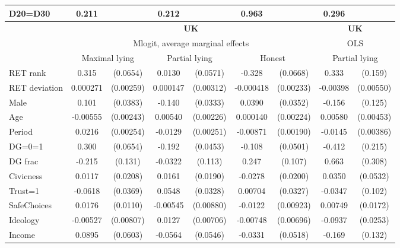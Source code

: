 \begin{tabular}{l|cccccc|cc}
D20=D30         &    0.211         &         &    0.212         &         &    0.963         &         &    0.296         &         \\
\hline\hline
&\multicolumn{6}{c|}{\bf UK}&\multicolumn{2}{c}{\bf UK}\\ &\multicolumn{6}{c|}{Mlogit, average marginal effects }&\multicolumn{2}{c}{OLS}\\
                &\multicolumn{2}{c}{Maximal lying}&\multicolumn{2}{c}{Partial lying}&\multicolumn{2}{c}{Honest}  &\multicolumn{2}{c}{Partial lying}\\
\hline
RET rank        &    0.315\sym{***}& (0.0654)&   0.0130         & (0.0571)&   -0.328\sym{***}& (0.0668)&    0.333\sym{**} &  (0.159)\\
RET deviation   & 0.000271         &(0.00259)& 0.000147         &(0.00312)&-0.000418         &(0.00233)& -0.00398         &(0.00550)\\
Male            &    0.101\sym{***}& (0.0383)&   -0.140\sym{***}& (0.0333)&   0.0390         & (0.0352)&   -0.156         &  (0.125)\\
Age             & -0.00555\sym{**} &(0.00243)&  0.00540\sym{**} &(0.00226)& 0.000140         &(0.00224)&  0.00580         &(0.00453)\\
Period          &   0.0216\sym{***}&(0.00254)&  -0.0129\sym{***}&(0.00251)& -0.00871\sym{***}&(0.00190)&  -0.0145\sym{***}&(0.00386)\\
DG=0=1          &    0.300\sym{***}& (0.0654)&   -0.192\sym{***}& (0.0453)&   -0.108\sym{**} & (0.0501)&   -0.412\sym{*}  &  (0.215)\\
DG frac         &   -0.215         &  (0.131)&  -0.0322         &  (0.113)&    0.247\sym{**} &  (0.107)&    0.663\sym{**} &  (0.308)\\
Civicness       &   0.0117         & (0.0208)&   0.0161         & (0.0190)&  -0.0278         & (0.0200)&   0.0350         & (0.0532)\\
Trust=1         &  -0.0618\sym{*}  & (0.0369)&   0.0548\sym{*}  & (0.0328)&  0.00704         & (0.0327)&  -0.0347         &  (0.102)\\
SafeChoices     &   0.0176         & (0.0110)& -0.00545         &(0.00880)&  -0.0122         &(0.00923)&  0.00749         & (0.0172)\\
Ideology        & -0.00527         &(0.00807)&   0.0127\sym{*}  &(0.00706)& -0.00748         &(0.00696)&  -0.0937\sym{***}& (0.0253)\\
Income          &   0.0895         & (0.0603)&  -0.0564         & (0.0546)&  -0.0331         & (0.0518)&   -0.169         &  (0.132)\\

\end{tabular}
